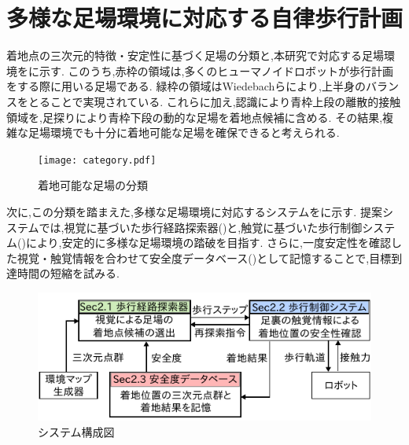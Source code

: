 \documentclass[twocolumn]{preport}
\begin{document}
\section{多様な足場環境に対応する自律歩行計画}
着地点の三次元的特徴・安定性に基づく足場の分類と,本研究で対応する足場環境をに示す.
このうち,赤枠の領域は,多くのヒューマノイドロボットが歩行計画をする際に用いる足場である.
緑枠の領域はWiedebachら\cite{wiedebach2016walking}により,上半身のバランスをとることで実現されている.
これらに加え,認識により青枠上段の離散的接触領域を,足探りにより青枠下段の動的な足場を着地点候補に含める.
その結果,複雑な足場環境でも十分に着地可能な足場を確保できると考えられる.

\begin{figure}[tbh]
 \begin{center}
   \centering
   \texttt{[image: category.pdf]}
   \caption{着地可能な足場の分類}
   \label{figure:category}
 \end{center}
\end{figure}

次に,この分類を踏まえた,多様な足場環境に対応するシステムをに示す.
提案システムでは,視覚に基づいた歩行経路探索器()と,触覚に基づいた歩行制御システム()により,安定的に多様な足場環境の踏破を目指す.
さらに,一度安定性を確認した視覚・触覚情報を合わせて安全度データベース()として記憶することで,目標到達時間の短縮を試みる.

\begin{figure}[tbh]
 \begin{center}
   \centering
   \includegraphics[width=\columnwidth]{system_fig.pdf}
   \caption{システム構成図}
   \label{figure:system}
 \end{center}
\end{figure}
\end{document}
